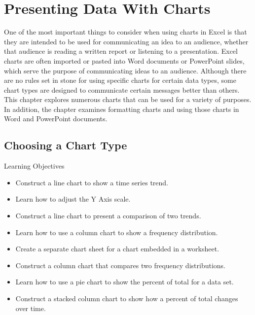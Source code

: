 \chapter{Presenting Data With Charts}\label{ch04:charts}

One of the most important things to consider when using charts in Excel is that they are intended to be used for communicating an idea to an audience, whether that audience is reading a written report or listening to a presentation. Excel charts are often imported or pasted into Word documents or PowerPoint slides, which serve the purpose of communicating ideas to an audience. Although there are no rules set in stone for using specific charts for certain data types, some chart types are designed to communicate certain messages better than others. This chapter explores numerous charts that can be used for a variety of purposes. In addition, the chapter examines formatting charts and using those charts in Word and PowerPoint documents.

\section{Choosing a Chart Type}

\begin{center}
	\begin{objbox}{Learning Objectives}
		\begin{itemize}
			\setlength{\itemsep}{0pt}
			\setlength{\parskip}{0pt}
			\setlength{\parsep}{0pt}

			\item Construct a line chart to show a time series trend.
			\item Learn how to adjust the Y Axis scale.
			\item Construct a line chart to present a comparison of two trends.
			\item Learn how to use a column chart to show a frequency distribution.
			\item Create a separate chart sheet for a chart embedded in a worksheet.
			\item Construct a column chart that compares two frequency distributions.
			\item Learn how to use a pie chart to show the percent of total for a data set.
			\item Construct a stacked column chart to show how a percent of total changes over time.
			
		\end{itemize}
	\end{objbox}
\end{center}

